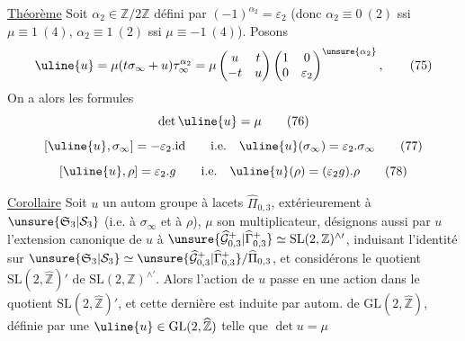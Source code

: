 \uline{Théorème} Soit $\alpha_2\in\mathbb Z/2\mathbb Z$ défini par
$(-1)^{\alpha_2}=\varepsilon_2$
(donc $\alpha_2\equiv0\ (2)$ ssi $\mu\equiv1\ (4)$,
$\alpha_2\equiv1\ (2)$ ssi
$\mu\equiv-1\ (4)$). Posons
\[
\uline{u}=\mu(t\sigma_\infty+u)\tau_\infty^{\alpha_2}
=\mu\begin{pmatrix}u&t\\-t&u\end{pmatrix}
\begin{pmatrix}1&0\\0&\varepsilon_2\end{pmatrix}^{\unsure{\alpha_2}},
\tag{75}
\]
On a alors les formules
\[
\det\uline{u}=\mu
\tag{76}
\]
\[
[\uline{u},\sigma_\infty]=-\varepsilon_2.\mathrm{id}
\qquad\text{i.e.}\quad\uline{u}(\sigma_\infty)=\varepsilon_2.\sigma_\infty
\tag{77}
\]
\[
[\uline{u},\rho]=\varepsilon_2.g
\qquad\text{i.e.}\quad\uline{u}(\rho)=(\varepsilon_2g).\rho
\tag{78}
\]

\uline{Corollaire} Soit $u$ un autom  groupe
à lacets $\widehat{\Pi}_{0,3}$,  extérieurement à
$\unsure{\mathfrak S_3|\mathcal S_3}$ (i.e. à $\sigma_\infty$ et à $\rho$), $\mu$
son multiplicateur, désignons aussi par
$u$ l'extension canonique de $u$ à
$\unsure{\widehat{\mathcal G}_{0,3}^{+}|\widehat{\Gamma}_{0,3}^{+}}
\simeq\mathrm{SL}(2,\mathbb Z)^{\wedge\prime}$,
induisant l'identité sur
$\unsure{\mathfrak S_3|\mathcal S_3}
\simeq\unsure{\widehat{\mathcal G}_{0,3}^{+}|\widehat{\Gamma}_{0,3}^{+}}/
\widehat{\Pi}_{0,3}$,
et considérons le quotient $\mathrm{SL}(2,\widehat{\mathbb Z})'$ de
$\mathrm{SL}(2,\mathbb Z)^{\wedge\prime}$. Alors l'action de $u$ passe
en une action dans le quotient $\mathrm{SL}(2,\widehat{\mathbb Z})'$,
et cette dernière est induite par autom.
de $\mathrm{GL}(2,\widehat{\mathbb Z})$, définie par une
 $\uline{u}\in\mathrm{GL}(2,\widehat{\mathbb Z})$
telle que $\det u=\mu$


